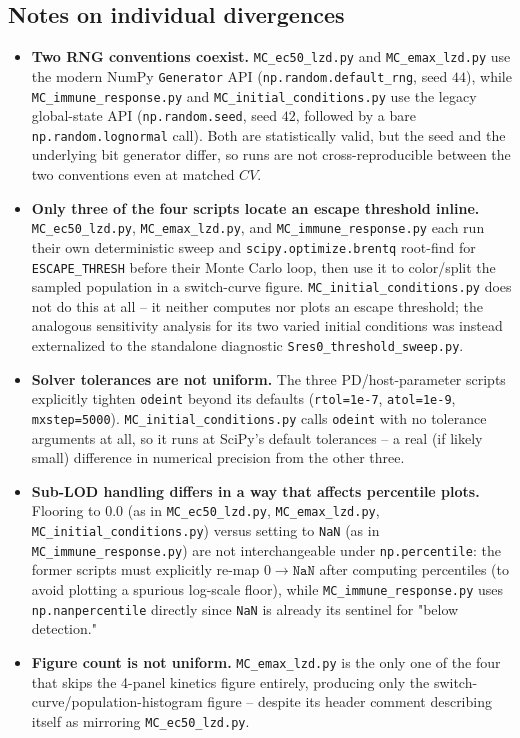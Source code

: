 \documentclass[11pt]{article}
\begin{document}
\subsection{Notes on individual divergences}

\begin{itemize}
\item \textbf{Two RNG conventions coexist.} \texttt{MC\_ec50\_lzd.py} and
\texttt{MC\_emax\_lzd.py} use the modern NumPy \texttt{Generator} API
(\texttt{np.random.default\_rng}, seed $44$), while
\texttt{MC\_immune\_response.py} and \texttt{MC\_initial\_conditions.py} use
the legacy global-state API (\texttt{np.random.seed}, seed $42$, followed by
a bare \texttt{np.random.lognormal} call). Both are statistically valid, but
the seed and the underlying bit generator differ, so runs are not
cross-reproducible between the two conventions even at matched $CV$.
\item \textbf{Only three of the four scripts locate an escape threshold
inline.} \texttt{MC\_ec50\_lzd.py}, \texttt{MC\_emax\_lzd.py}, and
\texttt{MC\_immune\_response.py} each run their own deterministic sweep and
\texttt{scipy.optimize.brentq} root-find for \texttt{ESCAPE\_THRESH} before
their Monte Carlo loop, then use it to color/split the sampled population in
a switch-curve figure. \texttt{MC\_initial\_conditions.py} does not do this
at all -- it neither computes nor plots an escape threshold; the analogous
sensitivity analysis for its two varied initial conditions was instead
externalized to the standalone diagnostic \texttt{Sres0\_threshold\_sweep.py}.
\item \textbf{Solver tolerances are not uniform.} The three PD/host-parameter
scripts explicitly tighten \texttt{odeint} beyond its defaults
(\texttt{rtol=1e-7}, \texttt{atol=1e-9}, \texttt{mxstep=5000}).
\texttt{MC\_initial\_conditions.py} calls \texttt{odeint} with no tolerance
arguments at all, so it runs at SciPy's default tolerances -- a real
(if likely small) difference in numerical precision from the other three.
\item \textbf{Sub-LOD handling differs in a way that affects percentile
plots.} Flooring to $0.0$ (as in \texttt{MC\_ec50\_lzd.py},
\texttt{MC\_emax\_lzd.py}, \texttt{MC\_initial\_conditions.py}) versus
setting to \texttt{NaN} (as in \texttt{MC\_immune\_response.py}) are not
interchangeable under \texttt{np.percentile}: the former scripts must
explicitly re-map $0 \to \mathtt{NaN}$ after computing percentiles (to avoid
plotting a spurious log-scale floor), while \texttt{MC\_immune\_response.py}
uses \texttt{np.nanpercentile} directly since \texttt{NaN} is already its
sentinel for "below detection."
\item \textbf{Figure count is not uniform.} \texttt{MC\_emax\_lzd.py} is the
only one of the four that skips the 4-panel kinetics figure entirely,
producing only the switch-curve/population-histogram figure --
despite its header comment describing itself as mirroring
\texttt{MC\_ec50\_lzd.py}.
\end{itemize}
\end{document}
